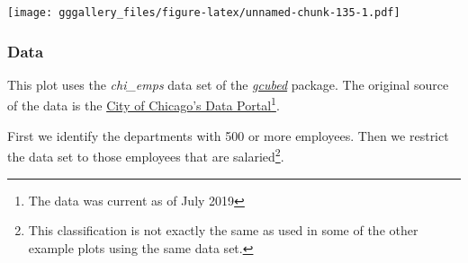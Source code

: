 \documentclass[]{book}
\newenvironment{Shaded}{\begin{snugshade}}{\end{snugshade}}
\newcommand{\DataTypeTok}[1]{\textcolor[rgb]{0.13,0.29,0.53}{#1}}
\newcommand{\DecValTok}[1]{\textcolor[rgb]{0.00,0.00,0.81}{#1}}
\newcommand{\KeywordTok}[1]{\textcolor[rgb]{0.13,0.29,0.53}{\textbf{#1}}}
\newcommand{\NormalTok}[1]{#1}
\newcommand{\OperatorTok}[1]{\textcolor[rgb]{0.81,0.36,0.00}{\textbf{#1}}}
\newcommand{\StringTok}[1]{\textcolor[rgb]{0.31,0.60,0.02}{#1}}
\let\rmarkdownfootnote\footnote%
\def\footnote{\protect\rmarkdownfootnote}
\begin{document}
\texttt{[image: gggallery\_files/figure-latex/unnamed-chunk-135-1.pdf]}

\hypertarget{chiboxdata}{%
\subsubsection*{Data}\label{chiboxdata}}

This plot uses the \emph{chi\_emps} data set of the \protect\hyperlink{gcubed}{\emph{gcubed}} package.
The original source of the data is the \href{https://data.cityofchicago.org/Administration-Finance/Current-Employee-Names-Salaries-and-Position-Title/xzkq-xp2w}{City of Chicago's Data Portal}\footnote{The data was current as of July 2019}.

First we identify the departments with 500 or more employees. Then we restrict the data set to those employees that are salaried\footnote{This classification is not exactly the same as used in some of the other example plots using the same data set.}.

\begin{Shaded}
\end{Shaded}
\end{document}
